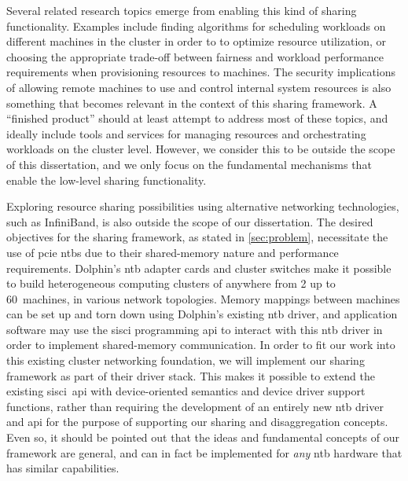 Several related research topics emerge from enabling this kind of sharing functionality.
%
Examples include finding algorithms for scheduling workloads on different machines in the cluster in order to to optimize resource utilization, or choosing the appropriate trade-off between fairness and workload performance requirements when provisioning resources to machines.
%
The security implications of allowing remote machines to use and control internal system resources is also something that becomes relevant in the context of this sharing framework.
%
A ``finished product'' should at least attempt to address most of these topics, and ideally include tools and services for managing resources and orchestrating workloads on the cluster level.
%
However, we consider this to be outside the scope of this dissertation, and we only focus on the fundamental mechanisms that enable the low-level sharing functionality.



Exploring resource sharing possibilities using alternative networking technologies, such as InfiniBand, is also outside the scope of our dissertation.
%
The desired objectives for the sharing framework, as stated in \cref{sec:problem}, necessitate the use of \gls{pcie} \glspl{ntb} due to their shared-memory nature and performance requirements.
%
Dolphin's \gls{ntb} adapter cards and cluster switches make it possible to build heterogeneous computing clusters of anywhere from 2 up to 60~machines, in various network topologies.
%
Memory mappings between machines can be set up and torn down using Dolphin's existing \gls{ntb} driver, and application software may use the \gls{sisci} programming \gls{api} to interact with this \gls{ntb} driver in order to implement shared-memory communication.
%
In order to fit our work into this existing cluster networking foundation, we will implement our sharing framework as part of their driver stack.
%
This makes it possible to extend the existing \gls{sisci}~\gls{api} with device-oriented semantics and device driver support functions, rather than requiring the development of an entirely new \gls{ntb} driver and \gls{api} for the purpose of supporting our sharing and \gls{disaggregation} concepts.
%
Even so, it should be pointed out that the ideas and fundamental concepts of our framework are general, and can in fact be implemented for \emph{any} \gls{ntb} hardware that has similar capabilities.



